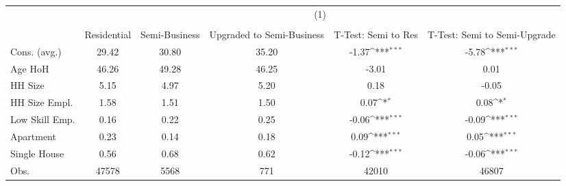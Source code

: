 {
\def\sym#1{\ifmmode^{#1}\else\(^{#1}\)\fi}
\begin{tabular}{l*{1}{ccccc}}
\hline\hline
                    &\multicolumn{5}{c}{(1)}                                                           \\
                    &\multicolumn{5}{c}{}                                                              \\
                    & Residential&Semi-Business&Upgraded to Semi-Business&T-Test: Semi to Res         &T-Test: Semi to Semi-Upgrade         \\
\hline
Cons. (avg.)        &       29.42&       30.80&       35.20&       -1.37\sym{***}&       -5.78\sym{***}\\
Age HoH             &       46.26&       49.28&       46.25&       -3.01         &        0.01         \\
HH Size             &        5.15&        4.97&        5.20&        0.18         &       -0.05         \\
HH Size Empl.       &        1.58&        1.51&        1.50&        0.07\sym{*}  &        0.08\sym{*}  \\
Low Skill Emp.      &        0.16&        0.22&        0.25&       -0.06\sym{***}&       -0.09\sym{***}\\
Apartment           &        0.23&        0.14&        0.18&        0.09\sym{***}&        0.05\sym{***}\\
Single House        &        0.56&        0.68&        0.62&       -0.12\sym{***}&       -0.06\sym{***}\\
Obs.                &    47578&     5568&      771&    42010         &    46807         \\
\hline\hline
\end{tabular}
}
